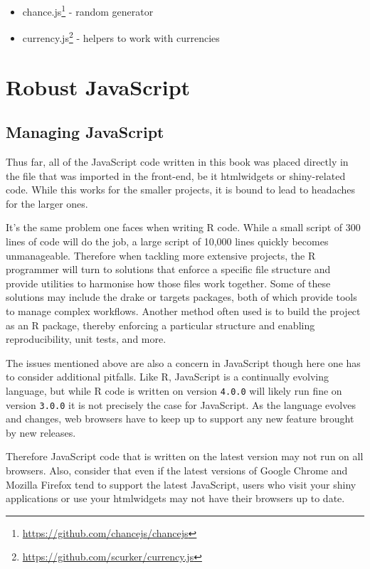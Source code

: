 \documentclass[
]{krantz}
\providecommand{\tightlist}{%
  \setlength{\itemsep}{0pt}\setlength{\parskip}{0pt}}
\renewcommand{\href}[2]{#2\footnote{\url{#1}}}
\begin{document}
\begin{itemize}
\tightlist
\item
  \href{https://github.com/chancejs/chancejs}{chance.js} - random generator
\item
  \href{https://github.com/scurker/currency.js}{currency.js} - helpers to work with currencies
\end{itemize}

\hypertarget{part-robust-javascript}{%
\part{Robust JavaScript}\label{part-robust-javascript}}

\hypertarget{webpack-intro}{%
\chapter{Managing JavaScript}\label{webpack-intro}}

Thus far, all of the JavaScript code written in this book was placed directly in the file that was imported in the front-end, be it htmlwidgets or shiny-related code. While this works for the smaller projects, it is bound to lead to headaches for the larger ones.

It's the same problem one faces when writing R code. While a small script of 300 lines of code will do the job, a large script of 10,000 lines quickly becomes unmanageable. Therefore when tackling more extensive projects, the R programmer will turn to solutions that enforce a specific file structure and provide utilities to harmonise how those files work together. Some of these solutions may include the drake \citep{R-drake} or targets \citep{R-targets} packages, both of which provide tools to manage complex workflows. Another method often used is to build the project as an R package, thereby enforcing a particular structure and enabling reproducibility, unit tests, and more.

The issues mentioned above are also a concern in JavaScript though here one has to consider additional pitfalls. Like R, JavaScript is a continually evolving language, but while R code is written on version \texttt{4.0.0} will likely run fine on version \texttt{3.0.0} it is not precisely the case for JavaScript. As the language evolves and changes, web browsers have to keep up to support any new feature brought by new releases.

Therefore JavaScript code that is written on the latest version may not run on all browsers. Also, consider that even if the latest versions of Google Chrome and Mozilla Firefox tend to support the latest JavaScript, users who visit your shiny applications or use your htmlwidgets may not have their browsers up to date.
\end{document}
